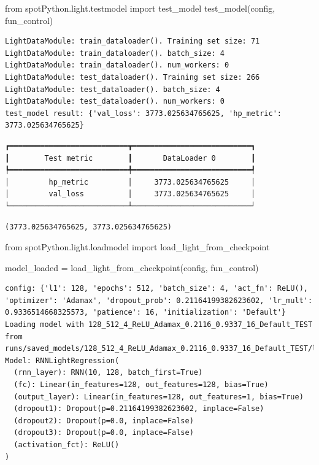 \documentclass[
  letterpaper,
  DIV=11,
  numbers=noendperiod]{scrreprt}
\newenvironment{Shaded}{\begin{snugshade}}{\end{snugshade}}
\newcommand{\ImportTok}[1]{\textcolor[rgb]{0.00,0.46,0.62}{#1}}
\newcommand{\NormalTok}[1]{\textcolor[rgb]{0.00,0.23,0.31}{#1}}
\newcommand{\OperatorTok}[1]{\textcolor[rgb]{0.37,0.37,0.37}{#1}}
\begin{document}
\begin{Shaded}
\begin{Highlighting}[]
\ImportTok{from}\NormalTok{ spotPython.light.testmodel }\ImportTok{import}\NormalTok{ test\_model}
\NormalTok{test\_model(config, fun\_control)}
\end{Highlighting}
\end{Shaded}

\begin{verbatim}
LightDataModule: train_dataloader(). Training set size: 71
LightDataModule: train_dataloader(). batch_size: 4
LightDataModule: train_dataloader(). num_workers: 0
LightDataModule: test_dataloader(). Training set size: 266
LightDataModule: test_dataloader(). batch_size: 4
LightDataModule: test_dataloader(). num_workers: 0
test_model result: {'val_loss': 3773.025634765625, 'hp_metric': 3773.025634765625}
\end{verbatim}

\begin{verbatim}
┏━━━━━━━━━━━━━━━━━━━━━━━━━━━┳━━━━━━━━━━━━━━━━━━━━━━━━━━━┓
┃        Test metric        ┃       DataLoader 0        ┃
┡━━━━━━━━━━━━━━━━━━━━━━━━━━━╇━━━━━━━━━━━━━━━━━━━━━━━━━━━┩
│         hp_metric         │     3773.025634765625     │
│         val_loss          │     3773.025634765625     │
└───────────────────────────┴───────────────────────────┘
\end{verbatim}

\begin{verbatim}
(3773.025634765625, 3773.025634765625)
\end{verbatim}

\begin{Shaded}
\begin{Highlighting}[]
\ImportTok{from}\NormalTok{ spotPython.light.loadmodel }\ImportTok{import}\NormalTok{ load\_light\_from\_checkpoint}

\NormalTok{model\_loaded }\OperatorTok{=}\NormalTok{ load\_light\_from\_checkpoint(config, fun\_control)}
\end{Highlighting}
\end{Shaded}

\begin{verbatim}
config: {'l1': 128, 'epochs': 512, 'batch_size': 4, 'act_fn': ReLU(), 'optimizer': 'Adamax', 'dropout_prob': 0.21164199382623602, 'lr_mult': 0.9336514668325573, 'patience': 16, 'initialization': 'Default'}
Loading model with 128_512_4_ReLU_Adamax_0.2116_0.9337_16_Default_TEST from runs/saved_models/128_512_4_ReLU_Adamax_0.2116_0.9337_16_Default_TEST/last.ckpt
Model: RNNLightRegression(
  (rnn_layer): RNN(10, 128, batch_first=True)
  (fc): Linear(in_features=128, out_features=128, bias=True)
  (output_layer): Linear(in_features=128, out_features=1, bias=True)
  (dropout1): Dropout(p=0.21164199382623602, inplace=False)
  (dropout2): Dropout(p=0.0, inplace=False)
  (dropout3): Dropout(p=0.0, inplace=False)
  (activation_fct): ReLU()
)
\end{verbatim}
\end{document}
